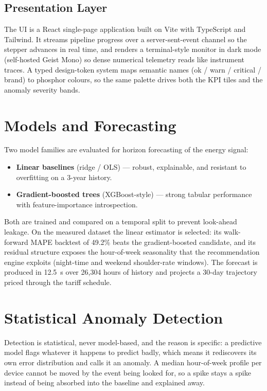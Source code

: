 \documentclass[conference, 10pt, a4paper]{IEEEtran}
\begin{document}
\subsection{Presentation Layer}
The UI is a React single-page application built on Vite with TypeScript and
Tailwind. It streams pipeline progress over a server-sent-event channel so the
stepper advances in real time, and renders a terminal-style monitor in dark
mode (self-hosted Geist Mono) so dense numerical telemetry reads like
instrument traces. A typed design-token system maps semantic names (ok / warn /
critical / brand) to phosphor colours, so the same palette drives both the
KPI tiles and the anomaly severity bands.

\section{Models and Forecasting}

Two model families are evaluated for horizon forecasting of the energy signal:

\begin{itemize}
\item \textbf{Linear baselines} (ridge / OLS) — robust, explainable, and
resistant to overfitting on a 3-year history.
\item \textbf{Gradient-boosted trees} (XGBoost-style) — strong tabular
performance with feature-importance introspection.
\end{itemize}

Both are trained and compared on a temporal split to prevent look-ahead
leakage. On the measured dataset the linear estimator is selected: its
walk-forward MAPE backtest of 49.2\% beats the gradient-boosted candidate, and
its residual structure exposes the hour-of-week seasonality that the
recommendation engine exploits (night-time and weekend shoulder-rate windows).
The forecast is produced in 12.5~s over 26,304 hours of history and projects a
30-day trajectory priced through the tariff schedule.

\section{Statistical Anomaly Detection}

Detection is statistical, never model-based, and the reason is specific: a
predictive model flags whatever it happens to predict badly, which means it
rediscovers its own error distribution and calls it an anomaly. A median
hour-of-week profile per device cannot be moved by the event being looked for,
so a spike stays a spike instead of being absorbed into the baseline and
explained away.
\end{document}
